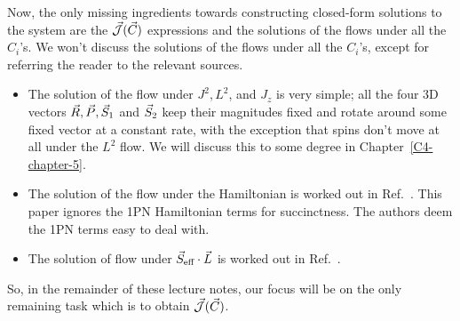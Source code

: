 Now, the only missing ingredients towards constructing closed-form solutions
to the system are the $\vec{\mathcal{J}}(\vec{C})$ expressions and
the solutions of the flows under all the $C_i$'s.
We won't discuss the solutions of the flows under all the $C_i$'s, 
except for referring the reader to the relevant sources.
\begin{itemize}
\item The solution of the flow under $J^2, L^2$, and $J_z$ is very simple;
all the four 3D vectors 
$\vec{R}, \vec{P}, \vec{S}_1$ and $\vec{S}_2$ 
keep their magnitudes fixed and 
rotate around some fixed vector at a constant rate, with the exception that
spins don't move at all under the $L^2$ flow. We will discuss this 
to some degree in Chapter~\ref{C4-chapter-5}.
\item The solution of the flow under the Hamiltonian is worked out in 
Ref.~\cite{Cho:2019brd}. This paper ignores the 1PN Hamiltonian terms
for succinctness. 
The authors deem the 1PN terms easy to deal with.
\item The solution of flow under $\vec{S}_{\text{eff}}\cdot \vec{L}$ is worked out in 
Ref.~\cite{tanay2021action}.
\end{itemize}
So, in the remainder of these lecture notes, our focus will be on the only
remaining task which is to obtain $\vec{\mathcal{J}}(\vec{C})$.







